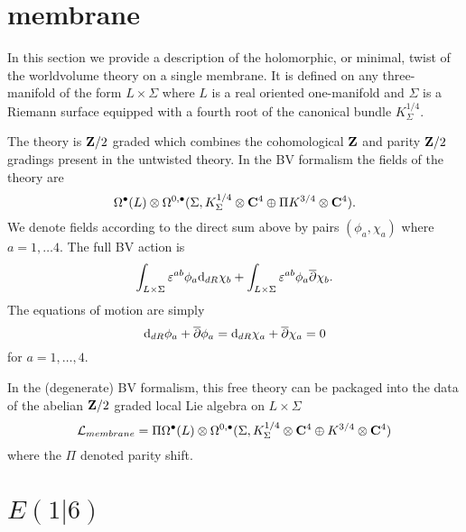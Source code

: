 \documentclass[11pt]{amsart}
\begin{document}
\section{membrane}

In this section we provide a description of the holomorphic, or minimal, twist of the worldvolume theory on a single membrane. 
It is defined on any three-manifold of the form $L \times \Sigma$ where $L$ is a real oriented one-manifold and $\Sigma$ is a Riemann surface equipped with a fourth root of the canonical bundle $K^{1/4}_\Sigma$.

The theory is $\mathbf{Z}/2$ graded which combines the cohomological $\mathbf{Z}$ and parity $\mathbf{Z}/2$ gradings present in the untwisted theory.
In the BV formalism the fields of the theory are
\[
\Omega^\bullet(L) \otimes \Omega^{0,\bullet}(\Sigma, K^{1/4}_\Sigma \otimes \mathbf{C}^4 \oplus \Pi K^{3/4} \otimes \mathbf{C}^4) .
\]
We denote fields according to the direct sum above by pairs $(\phi_a,\chi_a)$ where $a=1,\ldots 4$. 
The full BV action is 
\[
\int_{L \times \Sigma} \varepsilon^{ab} \phi_a {\rm d}_{dR} \chi_b + \int_{L \times \Sigma} \varepsilon^{ab} \phi_a \overline{\partial} \chi_b .
\]
The equations of motion are simply 
\[
{\rm d}_{dR} \phi_a + \overline{\partial} \phi_a = {\rm d}_{dR} \chi_a + \overline{\partial} \chi_a = 0
\]
for $a=1,\ldots, 4$. 

In the (degenerate) BV formalism, this free theory can be packaged into the data of the abelian $\mathbf{Z}/2$ graded local Lie algebra on $L \times \Sigma$ 
\[
\mathcal L_{membrane} = \Pi \Omega^\bullet(L) \otimes \Omega^{0,\bullet}(\Sigma, K^{1/4}_\Sigma \otimes \mathbf{C}^4 \oplus K^{3/4} \otimes \mathbf{C}^4)
\]
where the $\Pi$ denoted parity shift. 

\section{$E(1|6)$}
\end{document}
